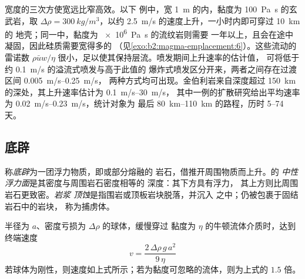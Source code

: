 宽度的三次方使宽远比窄高效。以下
例中，宽 \qty{1}{m} 的内，黏度为 \qty{100}{Pa.s} 的玄武岩，取 $\Delta\rho =
\qty{300}{kg/m^3}$，以约 \qty{2.5}{m/s} 的速度上升，一小时内即可穿过 \qty{10}{km} 的
地壳；同一中，黏度为 \qty{e6}{Pa.s} 的流纹岩则需要
一年以上，且会在途中凝固，因此硅质需要宽得多的
（见\cref{exo:b2:magma-emplacement:6}）。这些流动的雷诺数 $\rho\bar u w/\eta$
很小，足以使其保持层流。喷发期间上升速率的估计值，
可将低于约 \qty{0.1}{m/s} 的溢流式喷发与高于此值的
爆炸式喷发区分开来，两者之间存在过渡区间 \qtyrange{0.005}{0.25}{m/s}，
两种方式均可出现。金伯利岩来自深度超过
\qty{150}{km} 的深处，其上升速率估计为 \qtyrange{0.1}{30}{m/s}，
其中一例的扩散研究给出平均速率为 \qtyrange{0.02}{0.23}{m/s}，统计对象为
最后 \qtyrange{80}{110}{km} 的路程，历时 \numrange{5}{74} 天。

\subsection{底辟}

\begin{definition}\label{def:b2:magma-emplacement:ascent}
称\emph{底辟}为一团浮力物质，即或部分熔融的
岩石，借推开周围物质而上升。的
\emph{中性浮力面}是其密度与周围岩石密度相等的
深度：其下方具有浮力，
其上方则比周围岩石更致密。\emph{岩浆
顶蚀}是指围岩或顶板岩块脱落，并沉入
之中；仍被包裹于固结岩石中的岩块，
称为捕虏体。
\end{definition}

\begin{proposition}[斯托克斯上升]\label{prop:b2:magma-emplacement:stokes}
半径为 $a$、密度亏损为 $\Delta\rho$ 的球体，缓慢穿过
黏度为 $\eta$ 的牛顿流体介质时，达到终端速度
\[
v = \frac{2\,\Delta\rho\,g\,a^2}{9\,\eta}
\]
若球体为刚性，则速度如上式所示；若为黏度可忽略的流体，则为上式的 $1.5$ 倍。
\end{proposition}
\admitted

